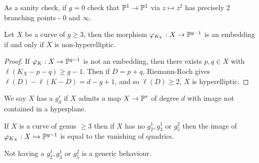 \documentclass[10pt,a4paper,rgb]{article}
\begin{document}
As a sanity check, if $g = 0$ check that $\P^1 \to \P^1$ via $z \mapsto z^2$ has precisely 2 branching points - 0 and $\infty$.

\begin{theorem}
Let $X$ be a curve of $g \geq 3$, then the morphism $\varphi_{K_Y} : X \to \P^{g-1}$ is an embedding if and only if $X$ is non-hyperelliptic.
\end{theorem}
\begin{proof}
If $\varphi_K : X \to \P^{g-1}$ is not an embedding, then there exists $p,q \in X$ with $\ell(K_X - p-q) \geq g-1$. Then if $D = p+q$, Riemann-Roch gives $\ell(D)-\ell(K-D) = d-g+1$, and so $\ell(D) \geq 2$, $X$ is hyperelliptic.
\end{proof}
We say $X$ has a $g^r_d$ if $X$ admits a map $X \to \P^r$ of degree $d$ with image not contained in a hyperplane.
\begin{theorem}
If $X$ is a curve of genus $\geq 3$ then if $X$ has no $g^1_2, g^1_3$ or $g^2_5$ then the image of $\varphi_{K_X}:X\injection \P^{g-1}$ is equal to the vanishing of quadrics.
\end{theorem}
Not having a $g^1_2, g^1_3$ or $g^2_5$ is a generic behaviour.
\end{document}
